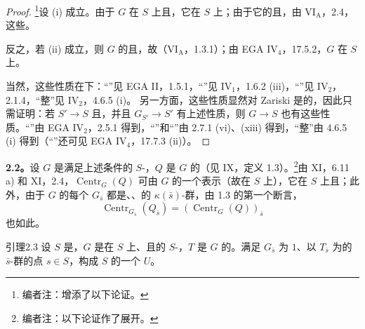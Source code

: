 \begin{proof}
\footnote[14]{编者注：增添了以下论证。}设 (i) 成立。由于 $G$ 在 $S$ 上且，它在 $S$ 上；由于它的且，由 VI$_{\mathrm A}$，2.4，这些。

反之，若 (ii) 成立，则 $G$ 的且，故（VI$_{\mathrm A}$，1.3.1）；由 EGA IV$_4$，17.5.2，$G$ 在 $S$ 上。

当然，这些性质在下：“”见 EGA II，1.5.1，“”见 IV$_1$，1.6.2 (iii)，“”见 IV$_2$，2.1.4，“整”见 IV$_2$，4.6.5 (i)。
另一方面，这些性质显然对 Zariski 是的，因此只需证明：若 $S'\to S$ 且，并且 $G_{S'}\to S'$ 有上述性质，则 $G\to S$ 也有这些性质。“”由 EGA IV$_2$，2.5.1 得到，“”和“”由 2.7.1 (vi)、(xiii) 得到，“整”由 4.6.5 (i) 得到（“”还可见 EGA IV$_4$，17.7.3 (ii)）。
\end{proof}
\textbf{2.2。}设 $G$ 是满足上述条件的 $S$-，$Q$ 是 $G$ 的（见 IX，定义 1.3）。\footnote[15]{编者注：以下论证作了展开。}由 XI，6.11 a) 和 XI，2.4，$\operatorname{Centr}_G(Q)$ 可由 $G$ 的一个表示（故在 $S$ 上），它在 $S$ 上且；此外，由于 $G$ 的每个 $G_{\bar s}$ 都是、、的 $\kappa(\bar s)$-群，由 1.3 的第一个断言，
\[
\operatorname{Centr}_{G_{\bar s}}(Q_{\bar s})=(\operatorname{Centr}_G(Q))_{\bar s}
\]
也如此。
\begin{SGAresult}{引理}{2.3}
设 $S$ 是，$G$ 是在 $S$ 上、且的 $S$-，$T$ 是 $G$ 的。满足 $G_{\bar s}$ 为 $1$、以 $T_{\bar s}$ 为的 $\bar s$-群的点 $s\in S$，构成 $S$ 的一个 $U$。
\end{SGAresult}
